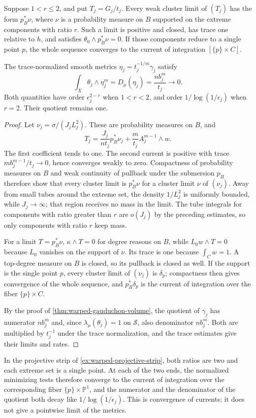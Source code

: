 \begin{proposition}\label{prop:warped-normalized-test-limits}
Suppose $1<r\leq2$, and put $T_j=G_j/t_j$. Every weak cluster limit of $(T_j)$ has the form $p_B^*\nu$, where $\nu$ is a probability measure on $B$ supported on the extreme components with ratio $r$. Such a limit is positive and closed, has trace one relative to $h$, and satisfies $\theta_0\wedge p_B^*\nu=0$. If those components reduce to a single point $p$, the whole sequence converges to the current of integration $[\{p\}\times C]$.

The trace-normalized smooth metrics $\eta_j=t_j^{-1/m}\gamma_j$ satisfy
\[
 \int_X\theta_j\wedge\eta_j^m=D_\mu(\eta_j)
                  =\frac{nb_j^m}{t_j}\longrightarrow0.
\]
Both quantities have order $\epsilon_j^{2-r}$ when $1<r<2$, and order $1/\log(1/\epsilon_j)$ when $r=2$. Their quotient remains one.
\end{proposition}
\begin{proof}
Let $\nu_j=\sigma/(J_jL_j^2)$. These are probability measures on $B$, and
\[
 T_j=\frac{J_j}{nt_j}p_B^*\nu_j
                   +\frac m{t_j}A_j^{m-1}\wedge w.
\]
The first coefficient tends to one. The second current is positive with trace $mb_j^{m-1}/t_j\to0$, hence converges weakly to zero. Compactness of probability measures on $B$ and weak continuity of pullback under the submersion $p_B$ therefore show that every cluster limit is $p_B^*\nu$ for a cluster limit $\nu$ of $(\nu_j)$. Away from small tubes around the extreme set, the density $1/L_j^2$ is uniformly bounded, while $J_j\to\infty$; that region receives no mass in the limit. The tube integrals for components with ratio greater than $r$ are $o(J_j)$ by the preceding estimates, so only components with ratio $r$ keep mass.

For a limit $T=p_B^*\nu$, $\kappa\wedge T=0$ for degree reasons on $B$, while $L_0w\wedge T=0$ because $L_0$ vanishes on the support of $\nu$. Its trace is one because $\int_Cw=1$. A top-degree measure on $B$ is closed, so its pullback is closed as well. If the support is the single point $p$, every cluster limit of $(\nu_j)$ is $\delta_p$; compactness then gives convergence of the whole sequence, and $p_B^*\delta_p$ is the current of integration over the fiber $\{p\}\times C$.

By the proof of \cref{thm:warped-gauduchon-volume}, the quotient of $\gamma_j$ has numerator $nb_j^m$ and, since $\lambda_\mu(\theta_j)=1$ on $\mathscr S$, also denominator $nb_j^m$. Both are multiplied by $t_j^{-1}$ under the trace normalization, and the trace estimates give their limits and rates.
\end{proof}

In the projective strip of \cref{ex:warped-projective-strip}, both ratios are two and each extreme set is a single point. At each of the two ends, the normalized minimizing tests therefore converge to the current of integration over the corresponding fiber $\{p\}\times\mathbb P^1$, and the numerator and the denominator of the quotient both decay like $1/\log(1/\epsilon_j)$. This is convergence of currents; it does not give a pointwise limit of the metrics.
